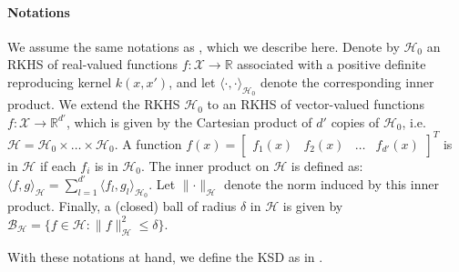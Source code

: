 

\paragraph*{Notations}

We assume the same notations as \citet{liu_svgd}, which we describe here. Denote by $\mathcal{H}_0$ an RKHS of real-valued functions $f:\mathcal{X} \rightarrow \mathbb{R}$ associated with a positive definite reproducing kernel $k(x, x')$, and let $\langle \cdot, \cdot \rangle_{\mathcal{H}_0}$ denote the corresponding inner product. We extend the RKHS $\mathcal{H}_0$ to an RKHS of vector-valued functions $f: \mathcal{X} \rightarrow \mathbb{R}^{d'}$, which is given by the Cartesian product of $d'$ copies of $\mathcal{H}_0$, i.e. $\mathcal{H} = \mathcal{H}_0 \times \dots \times \mathcal{H}_0$. A function $f(x) = \begin{bmatrix}f_1(x) & f_2(x) & \dots & f_{d'}(x) \end{bmatrix}^T$ is in $\mathcal{H}$ if each $f_i$ is in $\mathcal{H}_0$. The inner product on $\mathcal{H}$ is defined as: $\langle f, g \rangle_{\mathcal{H}} = \sum_{l=1}^{d'} \langle f_l, g_l \rangle_{\mathcal{H}_0}$. Let $\lVert \cdot \rVert_{\mathcal{H}}$ denote the norm induced by this inner product.
Finally, a (closed) ball of radius $\delta$ in $\mathcal{H}$ is given by $\mathcal{B}_{\mathcal{H}} = \{f \in \mathcal{H}: \lVert f \rVert_{\mathcal{H}}^2 \le \delta\}$.



With these notations at hand, we define the KSD as in \citet{liu_ksd}.

